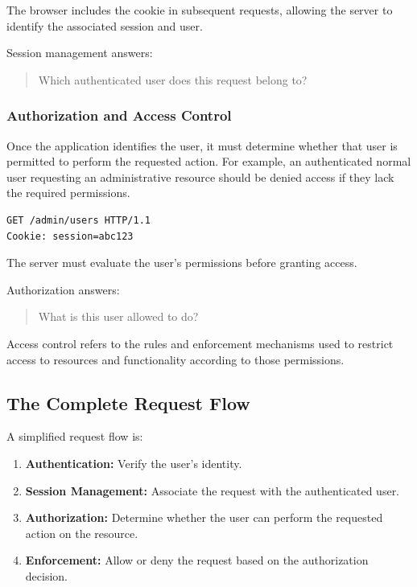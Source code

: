 \documentclass[11pt,a4paper]{article}
\begin{document}
The browser includes the cookie in subsequent requests, allowing the server to identify the associated session and user.

Session management answers:
\begin{quote}
    Which authenticated user does this request belong to?
\end{quote}

\subsubsection{Authorization and Access Control}

Once the application identifies the user, it must determine whether that user is permitted to perform the requested action.
For example, an authenticated normal user requesting an administrative resource should be denied access if they lack the required permissions.

\begin{lstlisting}[language=HTTP]
GET /admin/users HTTP/1.1
Cookie: session=abc123
\end{lstlisting}

The server must evaluate the user's permissions before granting access.

Authorization answers:
\begin{quote}
    What is this user allowed to do?
\end{quote}

Access control refers to the rules and enforcement mechanisms used to restrict access to resources and functionality according to those permissions.

\subsection{The Complete Request Flow}

A simplified request flow is:
\begin{enumerate}
    \item \textbf{Authentication:} Verify the user's identity.
    \item \textbf{Session Management:} Associate the request with the authenticated user.
    \item \textbf{Authorization:} Determine whether the user can perform the requested action on the resource.
    \item \textbf{Enforcement:} Allow or deny the request based on the authorization decision.
\end{enumerate}
\end{document}
